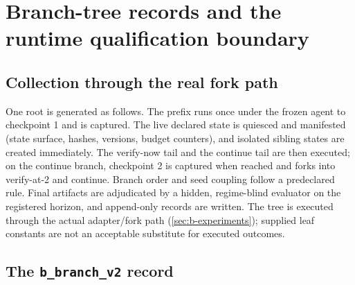 \section{Branch-tree records and the runtime qualification boundary}
\label{sec:b-data}

\subsection{Collection through the real fork path}

One root is generated as follows.  The prefix runs once under the frozen agent
to checkpoint 1 and is captured.  The live declared state is quiesced and
manifested (state surface, hashes, versions, budget counters), and isolated
sibling states are created immediately.  The verify-now tail and the continue
tail are then executed; on the continue branch, checkpoint 2 is captured when
reached and forks into verify-at-2 and continue.  Branch order and seed coupling
follow a predeclared rule.  Final artifacts are adjudicated by a hidden,
regime-blind evaluator on the registered horizon, and append-only records are
written.  The tree is executed through the actual adapter/fork path
(\cref{sec:b-experiments}); supplied leaf constants are not an acceptable
substitute for executed outcomes.

\subsection{The \texttt{b\_branch\_v2} record}
\label{sec:b-branch-schema}

